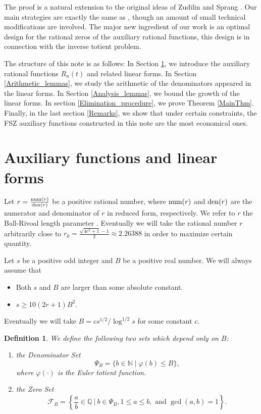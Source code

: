 \documentclass[11pt]{amsart}
\newtheorem{definition}[theorem]{Definition}
\numberwithin{equation}{section}
\begin{document}
\smallskip

The proof is a natural extension to the original ideas of Zudilin \cite{Zu18} and Sprang
\cite[Lemma 1.4]{Sp18}. Our main strategies are exactly the same as \cite{FSZ2019}, though an amount of small technical modifications are involved. The major new ingredient of our work is an optimal design for the rational zeros of the auxiliary rational functions, this design is in connection with the inverse totient problem.

The structure of this note is as follows: In Section \ref{Auxiliary_functions_and_linear_forms}, we introduce the auxiliary rational functions $R_n(t)$ and related linear forms. In Section \ref{Arithmetic_lemmas}, we study the arithmetic of the denominators appeared in the linear forms. In Section \ref{Analysis_lemmas}, we bound the growth of the linear forms. In section \ref{Elimination_procedure}, we prove Theorem \ref{MainThm}. Finally, in the last section \ref{Remarks}, we show that under certain constraints, the FSZ auxiliary functions constructed in this note are the most economical ones.
\bigskip

\section{Auxiliary functions and linear forms}
\label{Auxiliary_functions_and_linear_forms}

Let $r = \frac{{\rm num}{(r)}}{{\rm den}{(r)}}$ be a positive rational number, where ${\rm num}{(r)}$ and ${\rm den}{(r)}$ are the numerator and denominator of $r$ in reduced form, respectively. We refer to $r$ the Ball-Rivoal length parameter \cite{BR01}. Eventually we will take the rational number $r$ arbitrarily close to $r_0 = \frac{\sqrt{4e^2+1}-1}{2} \approx 2.26388$ in order to maximize certain quantity.

Let $s$ be a positive odd integer and $B$ be a positive real number. We will always assume that
\begin{itemize}
\item[(1)] Both $s$ and $B$ are larger than some absolute constant.
\item[(2)] $s \geqslant 10(2r+1)B^2$.
\end{itemize}
Eventually we will take $B = cs^{1/2}/\log^{1/2} s$ for some constant $c$.

\smallskip
\begin{definition}\label{SetDefinition} We define the following two sets which depend only on $B$:
\begin{enumerate}
\item[(1)] the \emph{Denominator Set}
\[ \mathcal{\varPsi}_B = \{ b \in \mathbb{N} \mid \varphi(b) \leqslant B \},\]
where $\varphi(\cdot)$ is the Euler totient function.
\item[(2)] the \emph{Zero Set}
\[ \mathcal{F}_{B} = \left\{ \frac{a}{b} \in \mathbb{Q} ~\bigg|~ b \in \mathcal{\varPsi}_B, 1 \leqslant a \leqslant b, \text{~and~} \gcd(a,b) = 1 \right\} .\]
\end{enumerate}
\end{definition}
\smallskip
\end{document}
